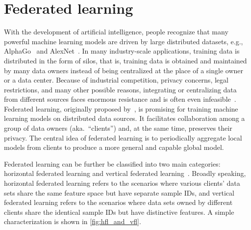 \section{Federated learning} \label{sec:1-4}
With the development of artificial intelligence, people recognize that many powerful machine learning models are driven by large distributed datasets, e.g., AlphaGo~\citep{silver2016mastering} and AlexNet~\citep{krizhevsky2012imagenet}. In many industry-scale applications, training data is distributed in the form of silos, that is, training data is obtained and maintained by many data owners instead of being centralized at the place of a single owner or a data center. Because of industrial competition, privacy concerns, legal restrictions, and many other possible reasons, integrating or centralizing data from different sources faces enormous resistance and is often even infeasible~\cite{li2020review}. Federated learning, originally proposed by~\citet{federated2016}, is promising for training machine learning models on distributed data sources. It facilitates collaboration among a group of data owners (aka.~``clients'') and, at the same time, preserves their privacy. The central idea of federated learning is to periodically aggregate local models from clients to produce a more general and capable global model.

Federated learning can be further be classified into two main categories: horizontal federated learning and vertical federated learning~\cite{yang2019federated}. Broadly speaking, horizontal federated learning refers to the scenarios where various clients' data sets share the same feature space but have separate sample IDs, and vertical federated learning refers to the scenarios where data sets owned by different clients share the identical sample IDs but have distinctive features. A simple characterization is shown in \autoref{fig:hfl_and_vfl}. 

